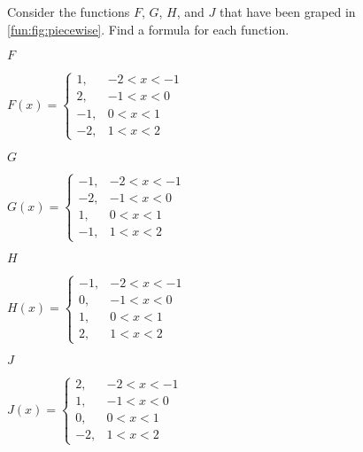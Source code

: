 \begin{exercises}
\begin{problem}
Consider the functions $F$, $G$, $H$, and $J$ that have been graped in 
\cref{fun:fig:piecewise}. Find a formula for 
each function.
\begin{multicols}{4}
	\begin{subproblem}
		$F$  
		\begin{shortsolution}
			$
			F(x)=
			\begin{cases}
				1,  & -2<x<-1 \\
				2,  & -1<x<0  \\
				-1, & 0<x<1   \\
				-2, & 1<x<2   
			\end{cases}
			$
		\end{shortsolution}
	\end{subproblem}
	\begin{subproblem}
		$G$
		\begin{shortsolution}
			$
			G(x)=
			\begin{cases}
				-1, & -2<x<-1 \\
				-2, & -1<x<0  \\
				1,  & 0<x<1   \\
				-1, & 1<x<2   
			\end{cases}
			$
		\end{shortsolution}
	\end{subproblem}
	\begin{subproblem}
		$H$
		\begin{shortsolution}
			$
			H(x)=
			\begin{cases}
				-1, & -2<x<-1 \\
				0,  & -1<x<0  \\
				1,  & 0<x<1   \\
				2,  & 1<x<2   
			\end{cases}
			$
		\end{shortsolution}
	\end{subproblem}
	\begin{subproblem}
		$J$
		\begin{shortsolution}
			$
			J(x)=
			\begin{cases}
				2,  & -2<x<-1 \\
				1,  & -1<x<0  \\
				0,  & 0<x<1   \\
				-2, & 1<x<2   
			\end{cases}
			$
		\end{shortsolution}
	\end{subproblem}
\end{multicols}


\end{problem}
\end{exercises}
